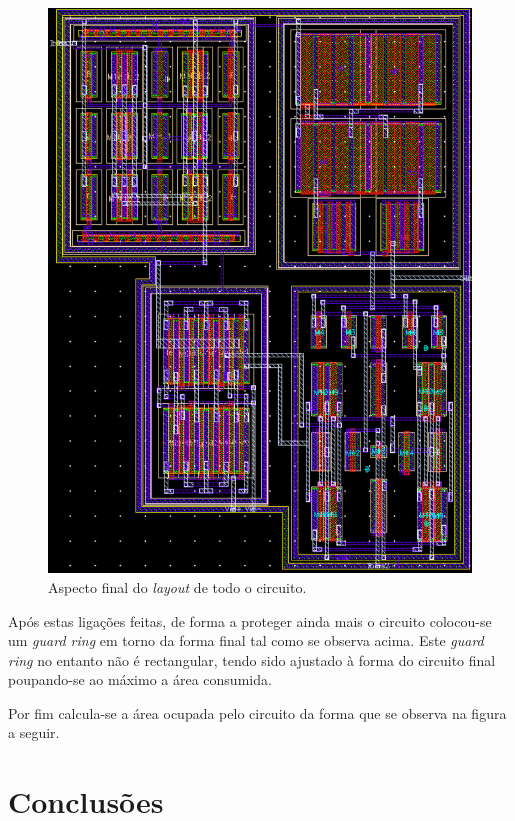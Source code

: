 \documentclass[11pt]{article}
\numberwithin{equation}{section}
\begin{document}
\begin{figure}[H]
	\centering
	\includegraphics[keepaspectratio=true, scale=0.50]{exps/layout/full}
	\vspace{-0.5em}
	\caption{Aspecto final do \textit{layout} de todo o circuito.}
	\vspace{-0.8em} 
\end{figure}

Após estas ligações feitas, de forma a proteger ainda mais o circuito colocou-se um \textit{guard ring} em torno da forma final tal como se observa acima. Este \textit{guard ring} no entanto não é rectangular, tendo sido ajustado à forma do circuito final poupando-se ao máximo a área consumida.

Por fim calcula-se a área ocupada pelo circuito da forma que se observa na figura a seguir.

\pagebreak

\section{Conclusões}
\end{document}
